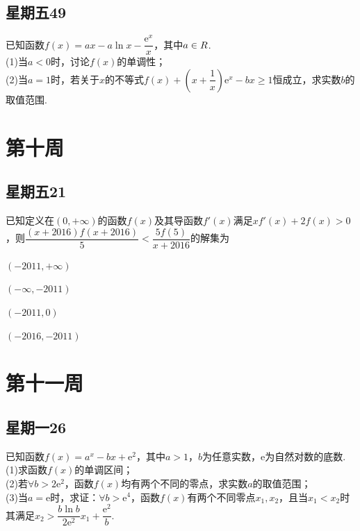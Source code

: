 \documentclass[UTF8,a4paper,11 pt]{ctexart}%
\newcommand\eu{\mathrm{e}}%
\let\mathbb\relax
\begin{document}
	\subsection{星期五49}\noindent
	已知函数$ f(x)=ax-a\ln x-\dfrac{\eu^x}{x} $，其中$ a\in\mathbb{R} $.
	\\(1)当$ a<0 $时，讨论$ f(x) $的单调性；
	\\(2)当$ a=1 $时，若关于$ x $的不等式$ f(x)+\left(x+\dfrac{1}{x}\right)\eu^x-bx\ge1 $恒成立，求实数$ b $的取值范围.
	\clearpage\section{第十周}
	\subsection{星期五21}\noindent
		已知定义在$ (0,+\infty) $的函数$ f(x) $及其导函数$ f'(x) $满足$ xf'(x)+2f(x)>0 $，则$ \dfrac{(x+2016)f(x+2016)}{5}<\dfrac{5f(5)}{x+2016} $的解集为
	\begin{xchoices}[label-style=Alph]
		\item $ (-2011,+\infty) $
		\item $ (-\infty,-2011) $
		\item $ (-2011,0) $
		\item* $ (-2016,-2011) $
	\end{xchoices}
	\clearpage\section{第十一周}
	\subsection{星期一26}\noindent
	已知函数$ f(x)=a^x-bx+\eu^2 $，其中$ a>1 $，$ b $为任意实数，$ \eu $为自然对数的底数.
	\\(1)求函数$ f(x) $的单调区间；
	\\(2)若$ \forall b>2\eu^2 $，函数$ f(x) $均有两个不同的零点，求实数$ a $的取值范围；
	\\(3)当$ a=\eu $时，求证：$ \forall b>\eu^4 $，函数$ f(x) $有两个不同零点$ x_1,x_2 $，且当$ x_1<x_2 $时其满足$ x_2>\dfrac{b\ln b}{2\eu^2}x_1+\dfrac{\eu^2}{b} $.
	\\\,\\\,\\\,\\\,\\\,\\\,
\end{document}
